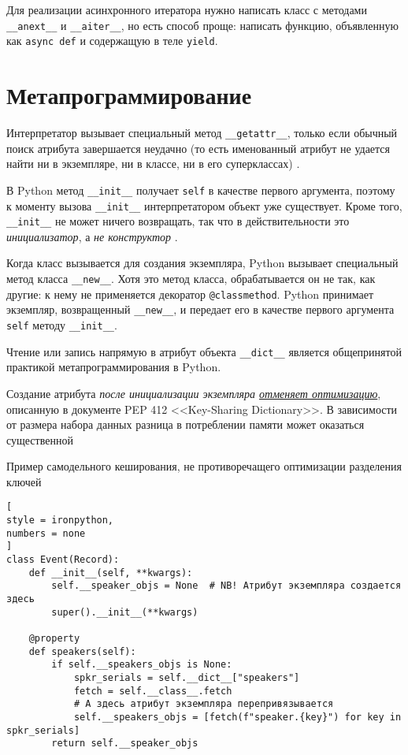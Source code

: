 \documentclass[%
	11pt,
	a4paper,
	utf8,
		]{article}
\begin{document}
Для реализации асинхронного итератора нужно написать класс с методами \verb*|__anext__| и \verb|__aiter__|, но есть способ проще: написать функцию, объявленную как \verb*|async def| и содержащую в теле \verb|yield|. 

\section{Метапрограммирование}

Интерпретатор вызывает специальный метод \verb*|__getattr__|, только если обычный поиск атрибута завершается неудачно (то есть именованный атрибут не удается найти ни в экземпляре, ни в классе, ни в его суперклассах) \cite[]{ramalho:python-2022}.

В Python метод \verb|__init__| получает \verb*|self| в качестве первого аргумента, поэтому к моменту вызова \verb|__init__| интерпретатором объект уже существует. Кроме того, \verb*|__init__| не может ничего возвращать, так что в действительности это \emph{инициализатор}, а \emph{не конструктор} \cite[]{ramalho:python-2022}. 

Когда класс вызывается для создания экземпляра, Python вызывает специальный метод класса \verb|__new__|. Хотя это метод класса, обрабатывается он не так, как другие: к нему не применяется декоратор \verb*|@classmethod|. Python принимает экземпляр, возвращенный \verb|__new__|, и передает его в качестве первого аргумента \verb*|self| методу \verb|__init__|. 

Чтение или запись напрямую в атрибут объекта \verb*|__dict__| является общепринятой практикой метапрограммирования в Python.

{\color{red}
Создание атрибута \emph{после инициализации экземпляра \underline{отменяет оптимизацию}}, описанную в документе PEP 412 <<Key-Sharing Dictionary>>. В зависимости от размера набора данных разница в потреблении памяти может оказаться существенной
}

Пример самодельного кеширования, не противоречащего оптимизации разделения ключей \cite[]{ramalho:python-2022}
\begin{lstlisting}[
style = ironpython,
numbers = none
]
class Event(Record):
    def __init__(self, **kwargs):
        self.__speaker_objs = None  # NB! Атрибут экземпляра создается здесь
        super().__init__(**kwargs)
        
    @property
    def speakers(self):
        if self.__speakers_objs is None:
            spkr_serials = self.__dict__["speakers"]
            fetch = self.__class__.fetch
            # А здесь атрибут экземпляра перепривязывается
            self.__speakers_objs = [fetch(f"speaker.{key}") for key in spkr_serials]
        return self.__speaker_objs
\end{lstlisting}
\end{document}
